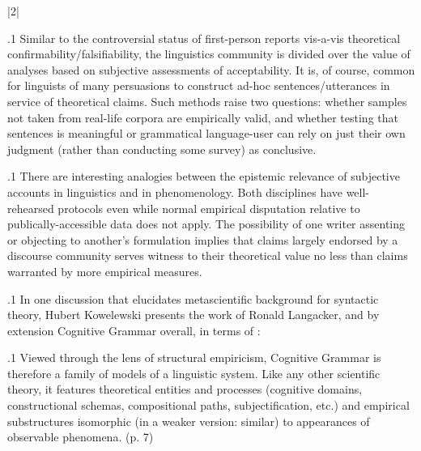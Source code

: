 \documentclass[11pt, twocolumn]{article}
\begin{document}
\s|2|{}

\p.1{%
Similar to the controversial status of first-person reports
vis-a-vis theoretical confirmability/falsifiability, the
linguistics community is divided over the value of
analyses based on subjective assessments of acceptability.
It is, of course, common for linguists of many persuasions
to construct ad-hoc sentences/utterances in service
of theoretical claims.  Such methods
raise two questions: whether samples not taken from
real-life corpora are empirically valid, and whether
\mdash{} testing that sentences is meaningful or grammatical
\mdash{} language-user can rely on just their own judgment
(rather than conducting some survey) as conclusive.
} %

\p.1{%
There are interesting analogies between the epistemic
relevance of subjective accounts in linguistics
and in phenomenology.  Both disciplines
have well-rehearsed protocols even while normal
empirical disputation relative to publically-accessible data
does not apply.  The possibility of one writer assenting
or objecting to another's formulation implies that
claims largely endorsed by a discourse community
serves witness to their theoretical value \mdash{} no
less than claims warranted by more empirical measures.
} %

\p.1{%
In one discussion that elucidates metascientific
background for syntactic theory, Hubert Kowelewski
presents the work of Ronald Langacker, and by extension
Cognitive Grammar overall, in terms of :
} %

\p.1{%
Viewed through the lens of structural empiricism, Cognitive Grammar
is therefore a family of models of a linguistic system.  Like any other scientific theory,
it features theoretical entities and processes (cognitive domains,
constructional schemas, compositional paths, subjectification, etc.)
and empirical substructures isomorphic (in a weaker version: similar) to appearances
of observable phenomena. (p. 7)
} %
\end{document}
